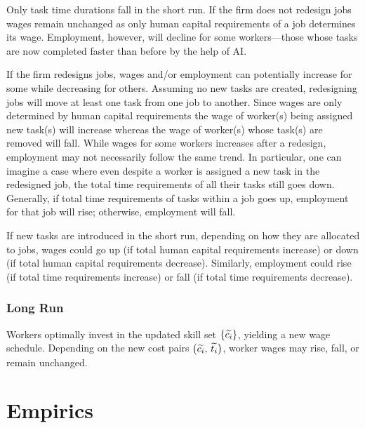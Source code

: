 \documentclass{article}
\theoremstyle{plain}
\theoremstyle{plain}
\begin{document}
Only task time durations fall in the short run.
If the firm does not redesign jobs wages remain unchanged as only human capital requirements of a job determines its wage.
Employment, however, will decline for some workers---those whose tasks are now completed faster than before by the help of AI.

If the firm redesigns jobs, wages and/or employment can potentially increase for some while decreasing for others.
Assuming no new tasks are created, redesigning jobs will move at least one task from one job to another.
Since wages are only determined by human capital requirements the wage of worker(s) being assigned new task(s) will increase whereas the wage of worker(s) whose task(s) are removed will fall.
While wages for some workers increases after a redesign, employment may not necessarily follow the same trend.
In particular, one can imagine a case where even despite a worker is assigned a new task in the redesigned job, the total time requirements of all their tasks still goes down.
Generally, if total time requirements of tasks within a job goes up, employment for that job will rise; otherwise, employment will fall.

If new tasks are introduced in the short run, depending on how they are allocated to jobs, wages could go up (if total human capital requirements increase) or down (if total human capital requirements decrease).
Similarly, employment could rise (if total time requirements increase) or fall (if total time requirements decrease).

\subsubsection{Long Run}  
Workers optimally invest in the updated skill set $\{\widetilde{c_{i}}\}$, yielding a new wage schedule. Depending on the new cost pairs $\bigl(\widetilde{c_{i}},\,\widetilde{t_{i}}\bigr)$, worker wages may rise, fall, or remain unchanged.



\section{Empirics}
\end{document}

